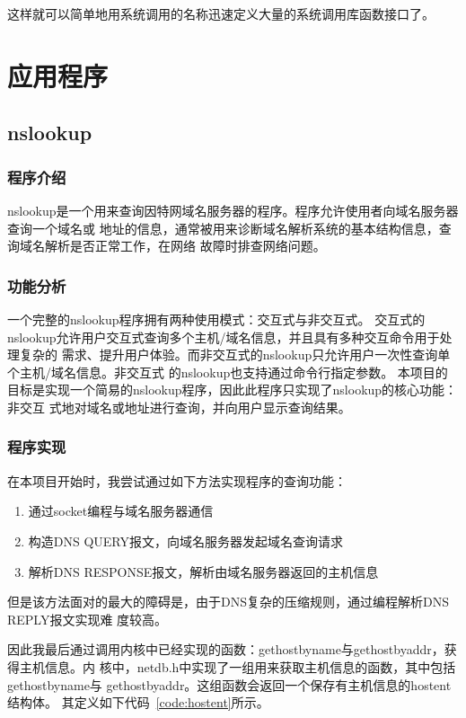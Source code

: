 \documentclass[a4paper,twoside]{ctexrep}
\begin{document}
\begin{spacing}{1.2}
这样就可以简单地用系统调用的名称迅速定义大量的系统调用库函数接口了。


\section{应用程序}
\label{sec:netapp}

\subsection{nslookup}
\label{sec:nslookup}

\subsubsection{程序介绍}

nslookup是一个用来查询因特网域名服务器的程序。程序允许使用者向域名服务器查询一个域名或
地址的信息，通常被用来诊断域名解析系统的基本结构信息，查询域名解析是否正常工作，在网络
故障时排查网络问题。

\subsubsection{功能分析}

一个完整的nslookup程序拥有两种使用模式：交互式与⾮交互式。
交互式的nslookup允许用户交互式查询多个主机/域名信息，并且具有多种交互命令用于处理复杂的
需求、提升用户体验。而⾮交互式的nslookup只允许用户一次性查询单个主机/域名信息。⾮交互式
的nslookup也⽀持通过命令⾏指定参数。
本项⽬的⽬标是实现一个简易的nslookup程序，因此此程序只实现了nslookup的核⼼功能：⾮交互
式地对域名或地址进⾏查询，并向用户显示查询结果。

\subsubsection{程序实现}

在本项目开始时，我尝试通过如下方法实现程序的查询功能：
\begin{enumerate}
	\item 通过socket编程与域名服务器通信
	\item 构造DNS QUERY报文，向域名服务器发起域名查询请求
	\item 解析DNS RESPONSE报文，解析由域名服务器返回的主机信息
\end{enumerate}

但是该方法⾯对的最大的障碍是，由于DNS复杂的压缩规则，通过编程解析DNS REPLY报文实现难
度较⾼。

因此我最后通过调用内核中已经实现的函数：gethostbyname与gethostbyaddr，获得主机信息。内
核中，netdb.h中实现了一组用来获取主机信息的函数，其中包括gethostbyname与
gethostbyaddr。这组函数会返回一个保存有主机信息的hostent结构体。
其定义如下代码~\ref{code:hostent}所示。


\end{spacing}
\end{document}
